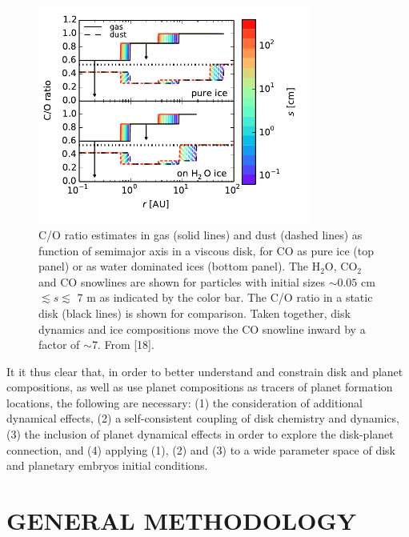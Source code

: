 \documentclass[12pt, letterpaper]{article}
\begin{document}
\begin{figure}[h!]
\centering
\includegraphics[width=0.8\textwidth]{C_O_water_ice.pdf}
\caption{C/O ratio estimates in gas (solid lines) and dust (dashed lines) as function of semimajor axis in a viscous disk, for CO as pure ice (top panel) or as water dominated ices (bottom panel). The H$_2$O, CO$_2$ and CO snowlines are shown for particles with initial sizes $\sim0.05$ cm $\lesssim s \lesssim$ 7 m as indicated by the color bar. The C/O ratio in a static disk (black lines) is shown for comparison. Taken together, disk dynamics and ice compositions move the CO snowline inward by a factor of $\sim$7. From [18].} 
\label{fig:CO_ratio}
\end{figure}

It it thus clear that, in order to better understand and constrain disk and planet compositions, as well as use planet compositions as tracers of planet formation locations, the following are necessary: (1) the consideration of additional dynamical effects, (2) a self-consistent coupling of disk chemistry and dynamics, (3) the inclusion of planet dynamical effects in order to explore the disk-planet connection, and (4) applying (1), (2) and (3) to a wide parameter space of disk and planetary embryos initial conditions.   


\section{GENERAL METHODOLOGY}

\end{document}
